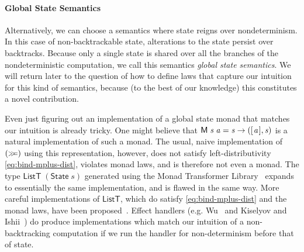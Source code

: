 \documentclass{jfp}
\newcommand{\Conid}[1]{\mathit{#1}}
\newcommand{\Varid}[1]{\mathit{#1}}
\let\Varid\mathit
\let\Conid\mathsf
\begin{document}
\paragraph{Global State Semantics}
Alternatively, we can choose a semantics where state reigns over nondeterminism.
In this case of non-backtrackable state, alterations to the state persist over
backtracks.
Because only a single state is shared over all the branches of the
nondeterministic computation, we call this semantics \emph{global state semantics}.
We will return later to the question of how to define laws that capture our
intuition for this kind of semantics, because (to the best of our knowledge)
this constitutes a novel contribution.

Even just figuring out an implementation of a global state monad that matches
our intuition is already tricky.
One might believe that \ensuremath{\Conid{M}\;\Varid{s}\;\Varid{a}\mathrel{=}\Varid{s}\to ([\mskip1.5mu \Varid{a}\mskip1.5mu],\Varid{s})} is a natural implementation of such a monad.
The usual, naive implementation of \ensuremath{(\mathrel{\hstretch{0.7}{>\!\!>\!\!=}})} using this representation, however, does not satisfy left-distributivity \eqref{eq:bind-mplus-dist}, violates monad laws, and is therefore not even a monad.
The type \ensuremath{\Conid{ListT}\;(\Conid{State}\;\Varid{s})} generated using the Monad Transformer Library~\cite{MTL:14} expands to essentially the same implementation, and is flawed in the same way.
More careful implementations of \ensuremath{\Conid{ListT}}, which do satisfy \eqref{eq:bind-mplus-dist} and the monad laws, have been proposed~\cite{Gale:07:ListT,Volkov:14:list-t}.
Effect handlers (e.g. Wu~\cite{Wu:14:Effect} and Kiselyov and
Ishii~\cite{KiselyovIshii:15:Freer}) do produce implementations which match our
intuition of a non-backtracking computation if we run the handler for
non-determinism before that of state.
\end{document}
